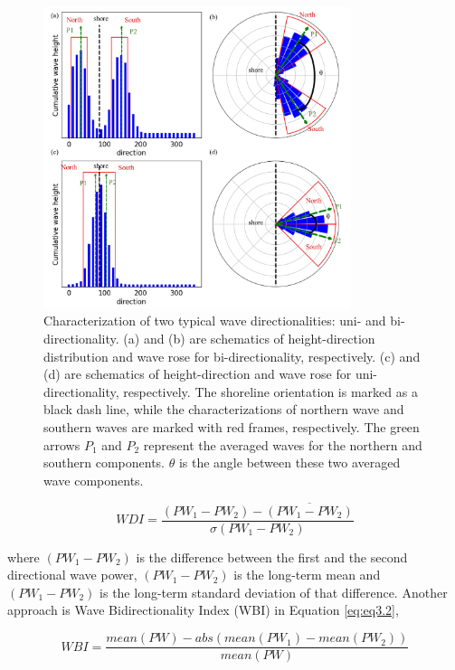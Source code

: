 \begin{figure}[htbp]
  \centering
  \includegraphics[width=0.8\textwidth]{chapter3/resources/figure3-2.jpg}
  \caption{Characterization of two typical wave directionalities: uni- and bi-directionality. (a) and (b) are schematics of height-direction distribution and wave rose for bi-directionality, respectively. (c) and (d) are schematics of height-direction and wave rose for uni-directionality, respectively. The shoreline orientation is marked as a black dash line, while the characterizations of northern wave and southern waves are marked with red frames, respectively. The green arrows $P_1$ and $P_2$ represent the averaged waves for the northern and southern components. $\theta$ is the angle between these two averaged wave components.}
  \label{fig:fig3.2}
\end{figure}

\begin{equation}
    WDI = \frac{(PW_1-PW_2) - \overline{(PW_1-PW_2)}}{\sigma(PW_1-PW_2)}
\label{eq:eq3.1}
\end{equation}

where $(PW_1-PW_2)$ is the difference between the first and the second
directional wave power, $(PW_1-PW_2)$ is the long-term mean and $(PW_1-PW_2)$ is
the long-term standard deviation of that difference. Another approach is Wave
Bidirectionality Index (WBI) \citep{abdelhady_shoreline_2025} in Equation
\ref{eq:eq3.2},

\begin{equation}
    WBI = \frac{mean(PW) - abs(mean(PW_1)-mean(PW_2))}{mean(PW)}
\label{eq:eq3.2}
\end{equation}

